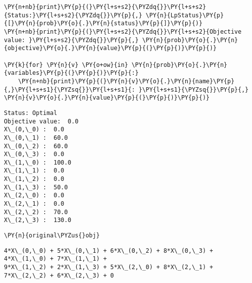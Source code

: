     \begin{tcolorbox}[breakable, size=fbox, boxrule=1pt, pad at break*=1mm,colback=cellbackground, colframe=cellborder]
\begin{Verbatim}[commandchars=\\\{\}]
\PY{n+nb}{print}\PY{p}{(}\PY{l+s+s2}{\PYZdq{}}\PY{l+s+s2}{Status:}\PY{l+s+s2}{\PYZdq{}}\PY{p}{,} \PY{n}{LpStatus}\PY{p}{[}\PY{n}{prob}\PY{o}{.}\PY{n}{status}\PY{p}{]}\PY{p}{)}
\PY{n+nb}{print}\PY{p}{(}\PY{l+s+s2}{\PYZdq{}}\PY{l+s+s2}{Objective value: }\PY{l+s+s2}{\PYZdq{}}\PY{p}{,} \PY{n}{prob}\PY{o}{.}\PY{n}{objective}\PY{o}{.}\PY{n}{value}\PY{p}{(}\PY{p}{)}\PY{p}{)}

\PY{k}{for} \PY{n}{v} \PY{o+ow}{in} \PY{n}{prob}\PY{o}{.}\PY{n}{variables}\PY{p}{(}\PY{p}{)}\PY{p}{:}
    \PY{n+nb}{print}\PY{p}{(}\PY{n}{v}\PY{o}{.}\PY{n}{name}\PY{p}{,}\PY{l+s+s1}{\PYZsq{}}\PY{l+s+s1}{: }\PY{l+s+s1}{\PYZsq{}}\PY{p}{,} \PY{n}{v}\PY{o}{.}\PY{n}{value}\PY{p}{(}\PY{p}{)}\PY{p}{)}
\end{Verbatim}
\end{tcolorbox}

    \begin{Verbatim}[commandchars=\\\{\}]
Status: Optimal
Objective value:  0.0
X\_(0,\_0) :  0.0
X\_(0,\_1) :  60.0
X\_(0,\_2) :  60.0
X\_(0,\_3) :  0.0
X\_(1,\_0) :  100.0
X\_(1,\_1) :  0.0
X\_(1,\_2) :  0.0
X\_(1,\_3) :  50.0
X\_(2,\_0) :  0.0
X\_(2,\_1) :  0.0
X\_(2,\_2) :  70.0
X\_(2,\_3) :  130.0
    \end{Verbatim}

    \begin{tcolorbox}[breakable, size=fbox, boxrule=1pt, pad at break*=1mm,colback=cellbackground, colframe=cellborder]
\begin{Verbatim}[commandchars=\\\{\}]
\PY{n}{original\PYZus{}obj}
\end{Verbatim}
\end{tcolorbox}

            \begin{tcolorbox}[breakable, size=fbox, boxrule=.5pt, pad at break*=1mm, opacityfill=0]
\begin{Verbatim}[commandchars=\\\{\}]
4*X\_(0,\_0) + 5*X\_(0,\_1) + 6*X\_(0,\_2) + 8*X\_(0,\_3) + 4*X\_(1,\_0) + 7*X\_(1,\_1) +
9*X\_(1,\_2) + 2*X\_(1,\_3) + 5*X\_(2,\_0) + 8*X\_(2,\_1) + 7*X\_(2,\_2) + 6*X\_(2,\_3) + 0
\end{Verbatim}
\end{tcolorbox}
        
